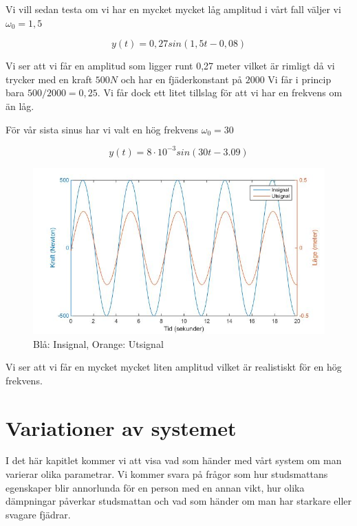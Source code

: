 \documentclass[10pt,a4paper]{article}
\begin{document}
Vi vill sedan testa om vi har en mycket mycket låg amplitud i vårt fall väljer vi $\omega_0 = 1,5$

\begin{equation}
y(t) = 0,27 sin(1,5 t - 0,08)
\end{equation}



Vi ser att vi får en amplitud som ligger runt 0,27 meter vilket är rimligt då vi trycker med en kraft $500N$ och har en fjäderkonstant på $2000$ Vi får i princip bara $500/2000 = 0,25$. Vi får dock ett litet tillslag för att vi har en frekvens om än låg.

För vår sista sinus har vi valt en hög frekvens $\omega_0 = 30$

\begin{equation}
y(t) = 8\cdot 10^{-3} sin(30 t - 3.09)
\end{equation}

\begin{figure}[h]
\begin{center}
\includegraphics[scale=0.4]{sinussvar2}
\caption{Blå: Insignal, Orange: Utsignal}
\end{center}
\end{figure}

Vi ser att vi får en mycket mycket liten amplitud vilket är realistiskt för en hög frekvens.




\newpage
\section{Variationer av systemet}

I det här kapitlet kommer vi att visa vad som händer med vårt system om man varierar olika parametrar. Vi kommer svara på frågor som hur studsmattans egenskaper blir annorlunda för en person med en annan vikt, hur olika dämpningar påverkar studsmattan och vad som händer om man har starkare eller svagare fjädrar.
\end{document}
